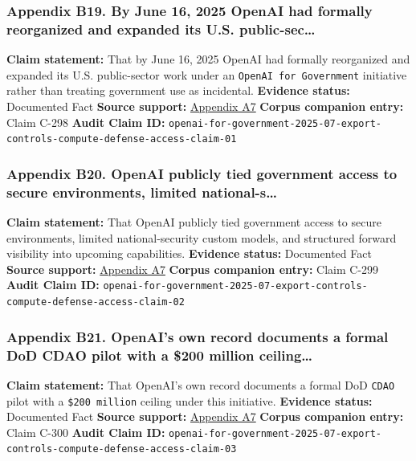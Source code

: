 \documentclass[
  american,
  11pt,
  letterpaper,
]{article}
\begin{document}
\subsubsection{Appendix B19. By June 16, 2025 OpenAI had formally
reorganized and expanded its U.S.
public-sec\ldots{}}\label{ch-10-appendix-b19-by-june-16-2025-openai-had-formally-reorganized-and-expanded-its-u-s-public-sec}

\textbf{Claim statement:} That by June 16, 2025 OpenAI had formally
reorganized and expanded its U.S. public-sector work under an
\texttt{OpenAI\ for\ Government} initiative rather than treating
government use as incidental. \textbf{Evidence status:} Documented Fact
\textbf{Source support:}
\hyperref[ch-10-appendix-a7-introducing-openai-for-government]{Appendix
A7} \textbf{Corpus companion entry:} Claim C-298 \textbf{Audit Claim
ID:}
\texttt{openai-for-government-2025-07-export-controls-compute-defense-access-claim-01}

\subsubsection{Appendix B20. OpenAI publicly tied government access to
secure environments, limited
national-s\ldots{}}\label{ch-10-appendix-b20-openai-publicly-tied-government-access-to-secure-environments-limited-national-s}

\textbf{Claim statement:} That OpenAI publicly tied government access to
secure environments, limited national-security custom models, and
structured forward visibility into upcoming capabilities.
\textbf{Evidence status:} Documented Fact \textbf{Source support:}
\hyperref[ch-10-appendix-a7-introducing-openai-for-government]{Appendix
A7} \textbf{Corpus companion entry:} Claim C-299 \textbf{Audit Claim
ID:}
\texttt{openai-for-government-2025-07-export-controls-compute-defense-access-claim-02}

\subsubsection{Appendix B21. OpenAI's own record documents a formal DoD
CDAO pilot with a \$200 million
ceiling\ldots{}}\label{ch-10-appendix-b21-openai-s-own-record-documents-a-formal-dod-cdao-pilot-with-a-200-million-ceiling}

\textbf{Claim statement:} That OpenAI's own record documents a formal
DoD \texttt{CDAO} pilot with a \texttt{\$200\ million} ceiling under
this initiative. \textbf{Evidence status:} Documented Fact
\textbf{Source support:}
\hyperref[ch-10-appendix-a7-introducing-openai-for-government]{Appendix
A7} \textbf{Corpus companion entry:} Claim C-300 \textbf{Audit Claim
ID:}
\texttt{openai-for-government-2025-07-export-controls-compute-defense-access-claim-03}
\end{document}
